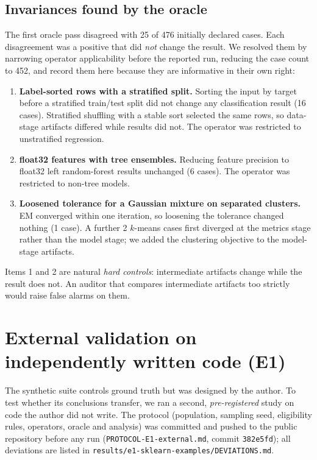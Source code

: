 \documentclass[11pt]{article}
\begin{document}
\subsection{Invariances found by the oracle}
\label{sec:invariances}

The first oracle pass disagreed with 25 of 476 initially declared cases. Each disagreement was a positive that did \emph{not} change the result. We resolved them by narrowing operator applicability before the reported run, reducing the case count to 452, and record them here because they are informative in their own right:
\begin{enumerate}
  \item \textbf{Label-sorted rows with a stratified split.} Sorting the input by target before a stratified train/test split did not change any classification result (16 cases). Stratified shuffling with a stable sort selected the same rows, so data-stage artifacts differed while results did not. The operator was restricted to unstratified regression.
  \item \textbf{float32 features with tree ensembles.} Reducing feature precision to float32 left random-forest results unchanged (6 cases). The operator was restricted to non-tree models.
  \item \textbf{Loosened tolerance for a Gaussian mixture on separated clusters.} EM converged within one iteration, so loosening the tolerance changed nothing (1 case). A further 2 $k$-means cases first diverged at the metrics stage rather than the model stage; we added the clustering objective to the model-stage artifacts.
\end{enumerate}
Items 1 and 2 are natural \emph{hard controls}: intermediate artifacts change while the result does not. An auditor that compares intermediate artifacts too strictly would raise false alarms on them.

\section{External validation on independently written code (E1)}
\label{sec:e1}

The synthetic suite controls ground truth but was designed by the author. To test whether its conclusions transfer, we ran a second, \emph{pre-registered} study on code the author did not write. The protocol (population, sampling seed, eligibility rules, operators, oracle and analysis) was committed and pushed to the public repository before any run (\texttt{PROTOCOL-E1-external.md}, commit \texttt{382e5fd}); all deviations are listed in \texttt{results/e1-sklearn-examples/DEVIATIONS.md}.
\end{document}
